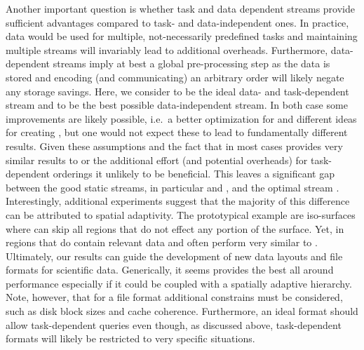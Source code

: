 Another important question is whether task and data dependent streams provide sufficient advantages compared to task- and data-independent ones. 
In practice, data would be used for multiple, not-necessarily predefined tasks and maintaining multiple streams will invariably lead to additional overheads. 
Furthermore, data-dependent streams imply at best a global pre-processing step as the data is stored and encoding (and communicating) an arbitrary order will likely negate any storage savings. 
Here, we consider \sopt to be the ideal data- and task-dependent stream and \ssig to be the best possible data-independent stream.  
In both case some improvements are likely possible, i.e.\ a better optimization for \sopt and different ideas for creating \ssig, but one would not expect these to lead to fundamentally different results. 
Given these assumptions and the fact that \ssig in most cases provides very similar results to \sbit or \swav the additional effort (and potential overheads) for task-dependent orderings it unlikely to be beneficial.
This leaves a significant gap between the good static streams, in particular \swav and \sbit, and the optimal stream \sopt. 
Interestingly, additional experiments suggest that the majority of this difference can be attributed to spatial adaptivity. 
The prototypical example are iso-surfaces where \sopt can skip all regions that do not effect any portion of the surface.  
Yet, in regions that do contain relevant data \swav and \sbit often perform very similar to \sopt. 
Ultimately, our results can guide the development of new data layouts and file formats for scientific data. 
Generically, it seems \swav provides the best all around performance especially if it could be coupled with a spatially adaptive hierarchy. 
Note, however, that for a file format additional constrains must be considered, such as disk block sizes and cache coherence. 
Furthermore, an ideal format should allow task-dependent queries even though, as discussed above, task-dependent formats will likely be restricted to very specific situations. 


